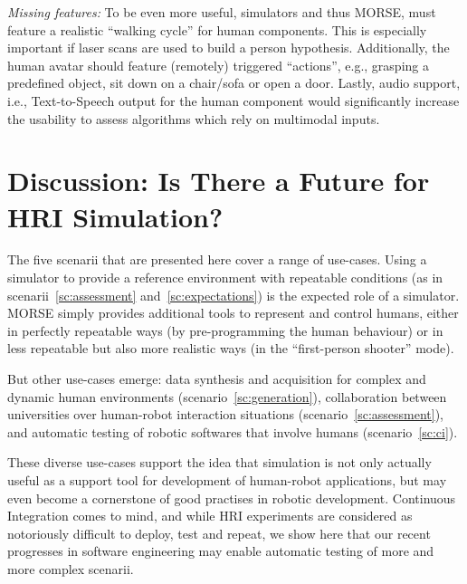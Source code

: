 \documentclass[conference]{IEEEtran}
\begin{document}
\emph{Missing features:} To be even more useful, simulators and thus MORSE, must
feature a realistic ``walking cycle'' for human components. This is especially
important if laser scans are used to build a person hypothesis. Additionally, the
human avatar should feature (remotely) triggered ``actions'', e.g., grasping a 
predefined object, sit down on a chair/sofa or open a door. Lastly, audio support, 
i.e., Text-to-Speech output for the human component would significantly increase
the usability to assess algorithms which rely on multimodal inputs.  

\section{Discussion: Is There a Future for HRI Simulation?}

The five scenarii that are presented here cover a range of use-cases. Using a
simulator to provide a reference environment with repeatable conditions (as in
scenarii~\ref{sc:assessment} and~\ref{sc:expectations}) is the expected role of
a simulator. MORSE simply provides additional tools to represent and control
humans, either in perfectly repeatable ways (by pre-programming the human
behaviour) or in less repeatable but also more realistic ways (in the
``first-person shooter'' mode).

But other use-cases emerge: data synthesis and acquisition for complex and
dynamic human environments (scenario~\ref{sc:generation}), collaboration between
universities over human-robot interaction situations
(scenario~\ref{sc:assessment}), and automatic testing of robotic softwares that
involve humans (scenario~\ref{sc:ci}).

These diverse use-cases support the idea that simulation is not only actually
useful as a support tool for development of human-robot applications, but may
even become a cornerstone of good practises in robotic development. Continuous
Integration comes to mind, and while HRI experiments are considered as
notoriously difficult to deploy, test and repeat, we show here that our recent
progresses in software engineering may enable automatic testing of more and more
complex scenarii.

%
\end{document}
